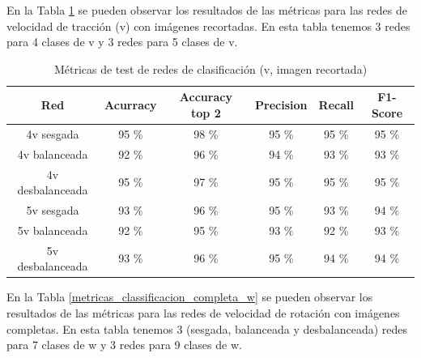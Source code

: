 En la Tabla \ref{metricas_classificacion_recortada_v} se pueden observar los resultados de las métricas para las redes de velocidad de tracción (v) con imágenes recortadas. En esta tabla tenemos 3 redes para 4 clases de v y 3 redes para 5 clases de v.\\

\begin{table}[H]
\centering
\caption{Métricas de test de redes de clasificación (v, imagen recortada)}
\label{metricas_classificacion_recortada_v}
\begin{tabular}{c|c|c|c|c|c|}
\cline{1-6}
                        \multicolumn{1}{|c|}{Red}    & Acurracy       & Accuracy top 2      & Precision       & Recall        & F1-Score        \\ \hline
\multicolumn{1}{|c|}{4v sesgada}    & 95 \%     & 98 \%         & 95 \%            & 95 \%          & 95 \%       \\ \hline
\multicolumn{1}{|c|}{4v balanceada}     & 92 \%        & 96 \%          &  94 \%              &  93 \%            &  93 \%             \\ \hline
\multicolumn{1}{|c|}{4v desbalanceada}      &  95 \%        & 97 \%           &  95 \%            & 95 \%        &  95 \%            \\ \hline
\multicolumn{1}{|c|}{5v sesgada}       & 93 \%         & 96 \%     & 95 \%            & 93 \%           & 94 \%              \\ \hline
\multicolumn{1}{|c|}{5v balanceada}      & 92 \%        & 95 \%         & 93 \%           & 92 \%     & 93 \%            \\ \hline
\multicolumn{1}{|c|}{5v desbalanceada}       & 93 \%          & 96 \%           & 95 \%          & 94 \%        & 94 \%               \\ \hline
\end{tabular}
\end{table}


En la Tabla \ref{metricas_classificacion_completa_w} se pueden observar los resultados de las métricas para las redes de velocidad de rotación con imágenes completas. En esta tabla tenemos 3 (sesgada, balanceada y desbalanceada) redes para 7 clases de w y 3 redes para 9 clases de w.\\

